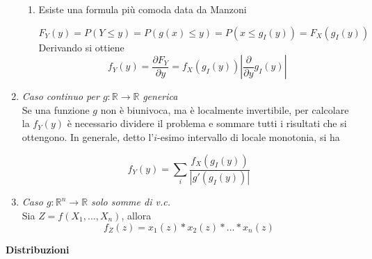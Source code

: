\documentclass[]{article}
\newcommand{\numberset}{\mathbb}
\newcommand{\R}{\numberset{R}}
\begin{document}
\begin{enumerate}
\begin{enumerate}
\item Esiste una formula più comoda data da Manzoni

\begin{equation}
F_Y (y)=P(Y\leq y)= P( g(x) \leq y) = P(x \leq g_I(y))= F_X (g_I(y))
\end{equation}
Derivando si ottiene
\begin{equation}
f_Y(y)= \frac{\partial F_Y}{\partial y}= f_X(g_I(y)) \left| \frac{\partial}{\partial y} g_I(y) \right|
\end{equation}
\end{enumerate}

\item \textit{Caso continuo per $g: \R \to \R$} \textit{generica} \\
Se una funzione $g$ non è biunivoca, ma è localmente invertibile, per calcolare la $f_Y(y)$ è necessario dividere il problema e sommare tutti i risultati che si ottengono. In generale, detto l'$i$-esimo intervallo di locale monotonia, si ha

\begin{equation}
f_Y(y)=\sum_{i}\frac{f_X(g_I(y))}{|g'(g_I(y))|}
\end{equation}

\item \textit{Caso $g: \R^n \to \R$ solo somme di v.c.}
\\
Sia $Z=f(X_1,...,X_n)$, allora
\begin{equation}
f_Z(z)=x_1(z)*x_2(z)*...*x_n(z)
\end{equation}
\end{enumerate}

\newpage

\textbf{Distribuzioni}
\end{document}
